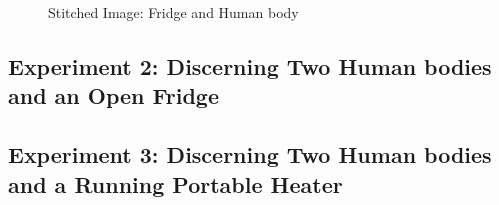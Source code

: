 \begin{figure*}[!htp]
\begin{minipage}{0.01\textwidth}
\begin{center}
\end{center}
\end{minipage}
\begin{minipage}{1.2\textwidth}
\begin{center}
\end{center}
\end{minipage}
\caption{Stitched Image: Fridge and Human body}
\label{fig:Stitched}
\end{figure*}



\subsection{Experiment 2: Discerning Two Human bodies and an Open Fridge}
\subsection{Experiment 3: Discerning Two Human bodies and a Running Portable Heater}
